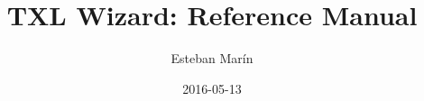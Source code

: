 \documentclass[12pt,a4paper]{article}
\begin{document}
\title{TXL Wizard: Reference Manual}
\author{Esteban Marín}
\date{2016-05-13}
\maketitle


\newpage
\tableofcontents
\pagestyle{headings}

\newpage








\end{document}
